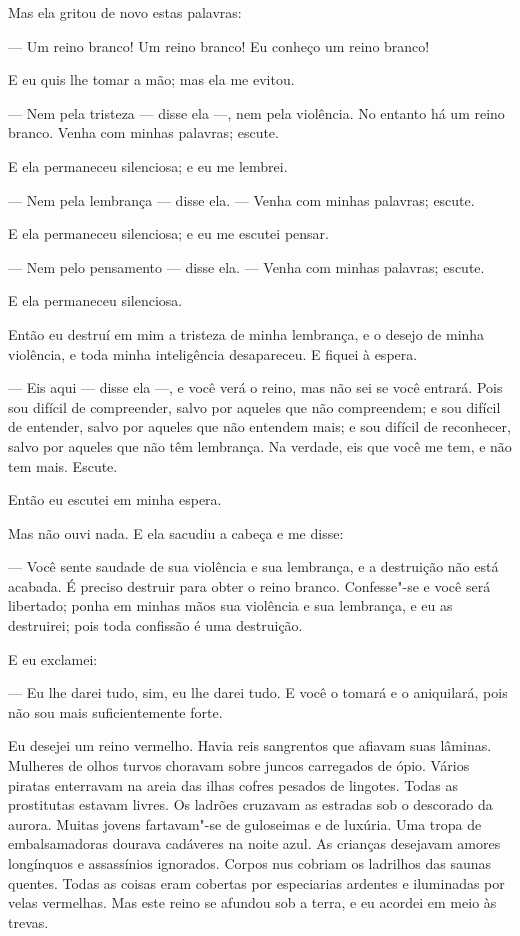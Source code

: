 Mas ela gritou de novo estas palavras:

--- Um reino branco! Um reino branco! Eu conheço um reino branco!

E eu quis lhe tomar a mão; mas ela me evitou.

--- Nem pela tristeza --- disse ela ---, nem pela violência. No entanto há um
reino branco. Venha com minhas palavras; escute.

E ela permaneceu silenciosa; e eu me lembrei.

--- Nem pela lembrança --- disse ela.  --- Venha com minhas palavras; escute.

E ela permaneceu silenciosa; e eu me escutei pensar.

--- Nem pelo pensamento --- disse ela. --- Venha com minhas palavras; escute.

E ela permaneceu silenciosa.

Então eu destruí em mim a tristeza de minha lembrança, e o desejo de
minha violência, e toda minha inteligência desapareceu. E fiquei à espera.

--- Eis aqui --- disse ela ---, e você verá o reino, mas não sei se você
entrará. Pois sou difícil de compreender, salvo por aqueles que não
compreendem; e sou difícil de entender, salvo por aqueles que não entendem
mais; e sou difícil de reconhecer, salvo por aqueles que não têm
lembrança. Na verdade, eis que você me tem, e não tem mais. Escute.

Então eu escutei em minha espera.

Mas não ouvi nada. E ela sacudiu a cabeça e me disse:

--- Você sente saudade de sua violência e sua lembrança, e a destruição
não está acabada. É preciso destruir para obter o reino branco.
Confesse"-se e você será libertado; ponha em minhas mãos sua violência e
sua lembrança, e eu as destruirei; pois toda confissão é uma destruição.

E eu exclamei:

--- Eu lhe darei tudo, sim, eu lhe darei tudo. E você o tomará e o
aniquilará, pois não sou mais suficientemente forte.

Eu desejei um reino vermelho. Havia reis sangrentos que afiavam suas
lâminas. Mulheres de olhos turvos choravam sobre juncos carregados de ópio.
Vários piratas enterravam na areia das ilhas cofres pesados de lingotes.
Todas as prostitutas estavam livres. Os ladrões cruzavam as estradas sob o
descorado da aurora. Muitas jovens fartavam"-se de guloseimas e de luxúria.
Uma tropa de embalsamadoras dourava cadáveres na noite azul. As crianças
desejavam amores longínquos e assassínios ignorados. Corpos nus cobriam os
ladrilhos das saunas quentes. Todas as coisas eram cobertas por
especiarias ardentes e iluminadas por velas vermelhas. Mas este reino se
afundou sob a terra, e eu acordei em meio às trevas.

